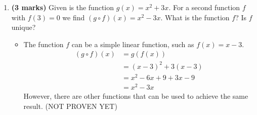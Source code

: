 \documentclass[12pt]{report}
\begin{document}
\begin{enumerate}[leftmargin=\labelsep]
    \item {\bf (3 marks)} Given is the function $g(x)=x^2+3x$. For a second function $f$ with $f(3)=0$ we find $(g \circ f)(x)=x^2-3x$. What is the function $f$? Is $f$ unique?
        \begin{itemize}[label={}]
            \item The function $f$ can be a simple linear function, such as $f(x)=x-3$. 
            \begin{equation*}
                \begin{split}
                    (g \circ f)(x) &= g(f(x)) \\
                    &= (x-3)^2+3(x-3) \\
                    &= x^2-6x+9+3x-9 \\
                    &= x^2-3x
                \end{split}
            \end{equation*}
            However, there are other functions that can be used to achieve the same result. (NOT PROVEN YET)
            
        \end{itemize}

\newpage        
    

\end{enumerate}
\end{document}
